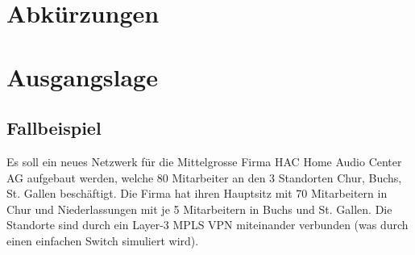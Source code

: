 \documentclass[11pt,a4paper]{scrreprt}
\begin{document}
\pagebreak

\tableofcontents 
\pagebreak

\listoffigures
\renewcommand*\clearpage{}

\lstlistoflistings
\newpage



\chapter{Abkürzungen}
\begin{acronym}[Bash]
\end{acronym}
\newpage


\chapter{Ausgangslage} 
\section{Fallbeispiel}
Es soll ein neues Netzwerk für die Mittelgrosse Firma HAC Home Audio Center AG aufgebaut werden, welche 80 Mitarbeiter an den 3 Standorten Chur, Buchs, St. Gallen beschäftigt. Die Firma hat ihren Hauptsitz mit 70 Mitarbeitern in Chur und Niederlassungen mit je 5 Mitarbeitern in Buchs und St. Gallen. Die Standorte sind durch ein Layer-3 MPLS VPN miteinander verbunden (was durch einen einfachen Switch simuliert wird).
\newpage
\end{document}
